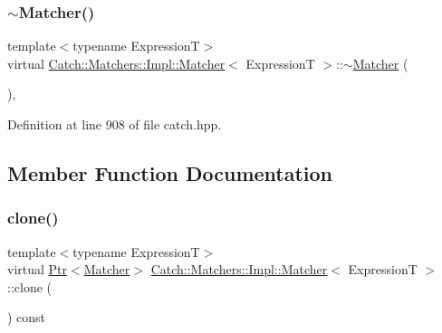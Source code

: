 \subsubsection{\texorpdfstring{$\sim$\+Matcher()}{~Matcher()}}
{\footnotesize\ttfamily template$<$typename ExpressionT$>$ \\
virtual \hyperlink{struct_catch_1_1_matchers_1_1_impl_1_1_matcher}{Catch\+::\+Matchers\+::\+Impl\+::\+Matcher}$<$ ExpressionT $>$\+::$\sim$\hyperlink{struct_catch_1_1_matchers_1_1_impl_1_1_matcher}{Matcher} (\begin{DoxyParamCaption}{ }\end{DoxyParamCaption})\hspace{0.3cm}{\ttfamily [inline]}, {\ttfamily [virtual]}}



Definition at line 908 of file catch.\+hpp.



\subsection{Member Function Documentation}
\hypertarget{struct_catch_1_1_matchers_1_1_impl_1_1_matcher_a9d31e5018fea24efa08c3cbf5aa4475d}{}\label{struct_catch_1_1_matchers_1_1_impl_1_1_matcher_a9d31e5018fea24efa08c3cbf5aa4475d} 
\subsubsection{\texorpdfstring{clone()}{clone()}}
{\footnotesize\ttfamily template$<$typename ExpressionT$>$ \\
virtual \hyperlink{class_catch_1_1_ptr}{Ptr}$<$\hyperlink{struct_catch_1_1_matchers_1_1_impl_1_1_matcher}{Matcher}$>$ \hyperlink{struct_catch_1_1_matchers_1_1_impl_1_1_matcher}{Catch\+::\+Matchers\+::\+Impl\+::\+Matcher}$<$ ExpressionT $>$\+::clone (\begin{DoxyParamCaption}{ }\end{DoxyParamCaption}) const\hspace{0.3cm}{\ttfamily [pure virtual]}}



